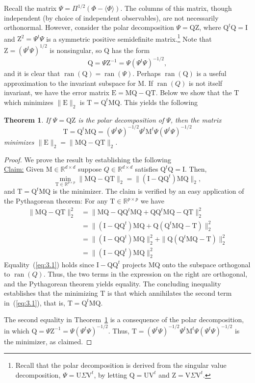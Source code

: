 \documentclass[12pt,letterpaper]{report}
\theoremstyle{plain}
\newtheorem{theorem}{Theorem}[chapter]
\theoremstyle{definition}
\newcounter{claim}
\theoremstyle{remark}
\numberwithin{theorem}{chapter}
\numberwithin{claim}{chapter}
\numberwithin{equation}{chapter}
\numberwithin{conjecture}{chapter}
\newcommand\R{\ensuremath{\mathbb{R}}}
\newcommand\M{\ensuremath{\mathrm{M}}}
\newcommand\T{\ensuremath{\mathrm{T}}}
\newcommand\I{\ensuremath{\mathrm{I}}}
\newcommand\Q{\ensuremath{\mathrm{Q}}}
\newcommand\Z{\ensuremath{\mathrm{Z}}}
\newcommand\E{\ensuremath{\mathrm{E}}}
\newcommand\U{\ensuremath{\mathrm{U}}}
\newcommand\V{\ensuremath{\mathrm{V}}}
\newcommand\ran{\ensuremath{\operatorname{ran}}}
\newcommand\<{\ensuremath{\langle}}
\renewcommand\>{\ensuremath{\rangle}}
\begin{document}
Recall the matrix $\Psi = \Pi^{1/2}(\Phi - \<\Phi\>)$. The columns of this
matrix, though independent (by choice of independent observables), are not
necessarily orthonormal. However, consider the polar decomposition 
$\Psi = \Q \Z$, where $\Q^t\Q = \I$ and $\Z^2 = \Psi^t\Psi$ is a symmetric
positive semidefinite matrix.\footnote{Recall that the polar decomposition is
  derived from the singular value decomposition, $\Psi = \U\Sigma \V^t$, by
  letting $\Q = \U \V^t$ and $\Z = \V\Sigma \V^t$.}
Note that $\Z = (\Psi^t\Psi)^{1/2}$ is nonsingular, so $\Q$ has the form
\[
\Q = \Psi \Z^{-1} = \Psi(\Psi^t\Psi)^{-1/2},
\]
and it is clear that $\ran(\Q) = \ran(\Psi)$. 
Perhaps $\ran(\Q)$ is a useful approximation to the invariant
subspace for $\M$. If $\ran(Q)$ is not itself invariant, we have the error 
matrix $\E =\M\Q - \Q\T$.  Below we show that the
$\T$ which minimizes $\|\E\|_2$ is $\T = \Q^t\M\Q$. 
This yields the following
\begin{theorem}
\label{thm:3.2.2}  
If $\Psi = \Q\Z$ is the polar decomposition of $\Psi$, then the matrix
\[
\T = \Q^t\M\Q = (\Psi^t\Psi)^{-1/2}\Psi^t \M^t \Psi (\Psi^t\Psi)^{-1/2}
\]
minimizes $\|\E\|_2 = \|\M\Q - \Q\T\|_2$.
\end{theorem}
\begin{proof}
We prove the result by establishing the following
\\[6pt]
\underline{Claim:} Given $\M \in \R^{d\times d}$ suppose $Q \in  \R^{d\times d}$
satisfies $\Q^t\Q =\I$. 
Then,
\[
\min_{\T\in \R^{p\times p}} \|\M\Q - \Q\T\|_2 = \|(\I- \Q\Q^t)\M\Q\|_2,
\]
and $\T = \Q^t\M\Q$ is the minimizer.
%
%
%
%
The claim is verified by an easy application of the Pythagorean theorem:
For any $\T \in \R^{p\times p}$ we have
\begin{align}
\label{eq:3.1}
\|\M\Q - \Q\T\|^2_2 &= \|\M\Q - \Q\Q^t\M\Q + \Q\Q^t\M\Q - \Q\T\|^2_2 \nonumber\\
&=\|(\I - \Q\Q^t)\M\Q + \Q(\Q^t\M\Q - \T)\|^2_2 \nonumber \\
&=\|(\I - \Q\Q^t)\M\Q\|^2_2 + \|\Q(\Q^t\M\Q - \T)\|^2_2 \\
&=\|(\I - \Q\Q^t)\M\Q\|^2_2 \nonumber
\end{align}
Equality~(\ref{eq:3.1}) holds since $\I - \Q\Q^t$ projects $\M\Q$ onto the
subspace orthogonal to 
$\ran(Q)$. Thus, the two terms in the expression on the right are orthogonal,
and the Pythagorean theorem yields equality. The concluding inequality
establishes that the minimizing $\T$ is that which annihilates the 
second term in~(\ref{eq:3.1}), that is, $\T = \Q^t\M\Q$.

The second equality in Theorem~\ref{thm:3.2.2} is a consequence of the polar decomposition, in
which $\Q = \Psi \Z^{-1} = \Psi(\Psi^t\Psi)^{-1/2}$. Thus,
$\T = (\Psi^t\Psi)^{-1/2}\Psi^t \M^t \Psi (\Psi^t\Psi)^{-1/2}$
is the minimizer, as claimed.
\end{proof}
\end{document}
